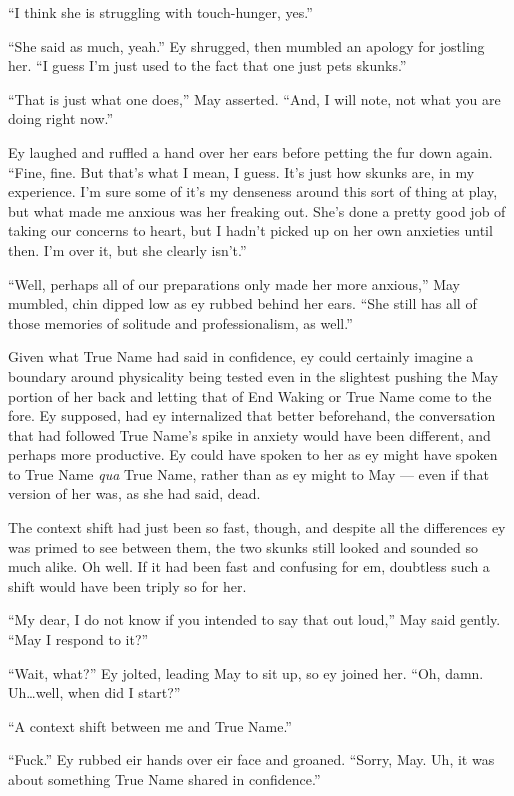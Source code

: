``I think she is struggling with touch-hunger, yes.''

``She said as much, yeah.'' Ey shrugged, then mumbled an apology for jostling her. ``I guess I'm just used to the fact that one just pets skunks.''

``That is just what one does,'' May asserted. ``And, I will note, not what you are doing right now.''

Ey laughed and ruffled a hand over her ears before petting the fur down again. ``Fine, fine. But that's what I mean, I guess. It's just how skunks are, in my experience. I'm sure some of it's my denseness around this sort of thing at play, but what made me anxious was her freaking out. She's done a pretty good job of taking our concerns to heart, but I hadn't picked up on her own anxieties until then. I'm over it, but she clearly isn't.''

``Well, perhaps all of our preparations only made her more anxious,'' May mumbled, chin dipped low as ey rubbed behind her ears. ``She still has all of those memories of solitude and professionalism, as well.''

Given what True Name had said in confidence, ey could certainly imagine a boundary around physicality being tested even in the slightest pushing the May portion of her back and letting that of End Waking or True Name come to the fore. Ey supposed, had ey internalized that better beforehand, the conversation that had followed True Name's spike in anxiety would have been different, and perhaps more productive. Ey could have spoken to her as ey might have spoken to True Name \emph{qua} True Name, rather than as ey might to May — even if that version of her was, as she had said, dead.

The context shift had just been so fast, though, and despite all the differences ey was primed to see between them, the two skunks still looked and sounded so much alike. Oh well. If it had been fast and confusing for em, doubtless such a shift would have been triply so for her.

``My dear, I do not know if you intended to say that out loud,'' May said gently. ``May I respond to it?''

``Wait, what?'' Ey jolted, leading May to sit up, so ey joined her. ``Oh, damn. Uh\ldots well, when did I start?''

``A context shift between me and True Name.''

``Fuck.'' Ey rubbed eir hands over eir face and groaned. ``Sorry, May. Uh, it was about something True Name shared in confidence.''

